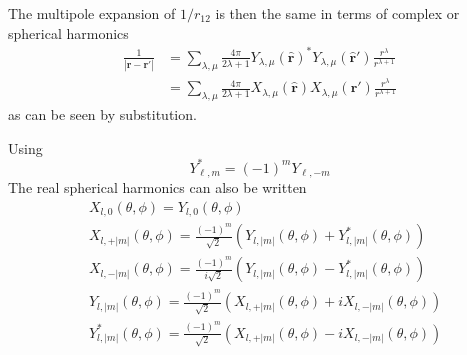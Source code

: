 \documentclass[%
pra%
,twocolumn%
,amssymb, nobibnotes, aps,
longbibliography
]{revtex4-1}
\begin{document}
The multipole expansion of $1/r_{12}$ is then the same in terms of complex or spherical harmonics 
\begin{equation}
\begin{split}
\frac{1}{| \mathbf{r}- \mathbf{r}'|} &= 
 \sum_{\lambda,\mu} \frac{4 \pi}{2\lambda +1}
Y_{\lambda,\mu}(\mathbf{\hat{r}})^*
Y_{\lambda,\mu}(\mathbf{\hat{r}}')
\frac{r^\lambda}{r^{\lambda+1}} \\
&= 
 \sum_{\lambda,\mu} \frac{4 \pi}{2\lambda +1}
X_{\lambda,\mu}(\mathbf{\hat{r}})
X_{\lambda,\mu}(\mathbf{\hat{r}}')
\frac{r^\lambda}{r^{\lambda+1}} 
\end{split}
\end{equation}
as can be seen by substitution.

Using
\begin{equation}
Y^*_{\ell,m} = (-1)^m Y_{\ell,-m} 
\end{equation}
The real spherical harmonics can also be written
\begin{equation}
\begin{split}
&X_{l,0}(\theta,\phi) = Y_{l,0}(\theta,\phi) \\
&X_{l,+|m|}(\theta,\phi) = \frac{(-1)^m}{\sqrt{2}} \left(Y_{l,|m|}(\theta,\phi) + Y^*_{l,|m|}(\theta,\phi) \right)\\
&X_{l,-|m|}(\theta,\phi) = \frac{(-1)^m}{i\sqrt{2}} \left(Y_{l,|m|}(\theta,\phi) -Y^*_{l,|m|}(\theta,\phi) \right)\\
& Y_{l,|m|}(\theta,\phi) = \frac{(-1)^m }{\sqrt{2}} (X_{l,+|m|}(\theta,\phi)+i X_{l,-|m|}(\theta,\phi)) \\
& Y^*_{l,|m|}(\theta,\phi) = \frac{(-1)^m}{\sqrt{2}}  (X_{l,+|m|}(\theta,\phi)-iX_{l,-|m|}(\theta,\phi)) \\
\end{split}
\end{equation}
\end{document}
